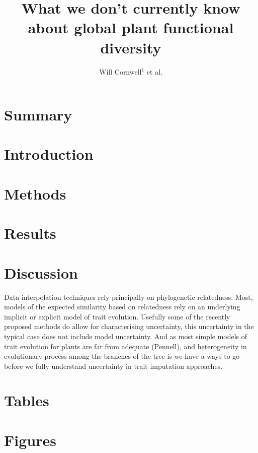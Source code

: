 \documentclass[a4paper,11pt]{article}
\title{What we don't currently know about global plant functional diversity}
\author{
Will Cornwell$^1$
et al.}
\affiliation{
*final list and order undecided\\
$^1$ University of NSW\\
}
\date{}
\begin{document}
\mstitlepage
\noindent

\section{Summary}


\section{Introduction}

\section{Methods}

\section{Results}


\section{Discussion}

Data interpolation techniques rely principally on phylogenetic relatedness.  
Most, models of the expected similarity based on relatedness rely on an underlying implicit or explicit model of trait evolution.  
Usefully some of the recently proposed methods do allow for characterising uncertainty, this uncertainty in the typical case
does not include model uncertainty.  And as most simple models of trait evolution for plants are far from adequate (Pennell), and heterogeneity in evolutionary 
process among the branches of the tree is 
we have a ways to go before we fully understand uncertainty in trait imputation approaches.   

\section{Tables}









\section{Figures}
\end{document}
